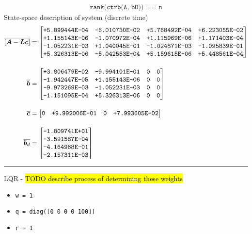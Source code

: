 \begin{align}\label{matlab:controllable}
\texttt{rank(ctrb(A, bD)) == n}
\end{align}
State-space description of system (discrete time)
\begin{align*}
\overline{\left[\boldsymbol{A} - \boldsymbol{L}\boldsymbol{c}\right]}
&=
\begin{bmatrix}
\texttt{+5.899444E-04} & \texttt{-6.010730E-02} & \texttt{+5.768492E-04} & \texttt{+6.223055E-02}\\
\texttt{+1.155143E-06} & \texttt{-1.070972E-04} & \texttt{+1.115969E-06} & \texttt{+1.171403E-04}\\
\texttt{-1.052231E-03} & \texttt{+1.040045E-01} & \texttt{-1.024871E-03} & \texttt{-1.095839E-01}\\
\texttt{+5.326313E-06} & \texttt{-5.042553E-04} & \texttt{+5.159615E-06} & \texttt{+5.448561E-04}
\end{bmatrix}
\\[11pt]
\overline{\boldsymbol{b}}
&=
\begin{bmatrix}
\texttt{+3.806479E-02} & \texttt{-9.994101E-01} & \texttt{0} & \texttt{0}\\
\texttt{-1.942447E-05} & \texttt{+1.155143E-06} & \texttt{0} & \texttt{0}\\
\texttt{-9.973269E-03} & \texttt{-1.052231E-03} & \texttt{0} & \texttt{0}\\
\texttt{-1.151095E-04} & \texttt{+5.326313E-06} & \texttt{0} & \texttt{0}
\end{bmatrix}
\\[11pt]
\overline{\boldsymbol{c}}
&=
\begin{bmatrix}
\texttt{0} & \texttt{+9.992006E-01} & \texttt{0} & \texttt{+7.993605E-02}
\end{bmatrix}
\\[11pt]
\overline{\boldsymbol{b}_d}
&=
\begin{bmatrix}
\texttt{-1.809741E+01}\\
\texttt{-3.591587E-04}\\
\texttt{-4.164968E-01}\\
\texttt{-2.157311E-03}
\end{bmatrix}
\end{align*}
\rule{\textwidth}{0.5pt}
LQR - \hl{TODO describe process of determining these weights}
\begin{itemize}
    \item \texttt{w = 1}
    \item \texttt{q = diag([0 0 0 0 100])}
    \item \texttt{r = 1}
\end{itemize}
